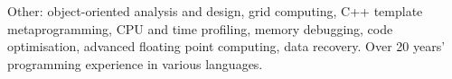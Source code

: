 \begin{longtable}{p{}p{}p{}}
\end{longtable}
\vspace{2\longtabletopsepspecial}
\begin{flushleft}
Other: object-oriented analysis and design, grid computing, {\sc C++} template metaprogramming, CPU and time profiling, memory debugging, code optimisation, advanced floating point computing, data recovery. Over 20 years' programming experience in various languages.
\end{flushleft}










